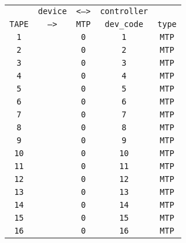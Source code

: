 \begin{adjustwidth}{5ex}{1ex}
	\begin{tabular}{ccccc}
		& \texttt{device} & \texttt{<-->} & \texttt{controller} &  \\
		\texttt{TAPE} & \texttt{-->} & \texttt{MTP}  & \texttt{dev\_code} & \texttt{type} \\
		\texttt{1} & & \texttt{0} &  \texttt{1} & \texttt{MTP} \\
		\texttt{2} & & \texttt{0} &  \texttt{2} & \texttt{MTP} \\
		\texttt{3} & & \texttt{0} &  \texttt{3} & \texttt{MTP} \\
		\texttt{4} & & \texttt{0} &  \texttt{4} & \texttt{MTP} \\
		\texttt{5} & & \texttt{0} &  \texttt{5} & \texttt{MTP} \\
		\texttt{6} & & \texttt{0} &  \texttt{6} & \texttt{MTP} \\
		\texttt{7} & & \texttt{0} &  \texttt{7} & \texttt{MTP} \\
		\texttt{8} & & \texttt{0} &  \texttt{8} & \texttt{MTP} \\
		\texttt{9} & & \texttt{0} &  \texttt{9} & \texttt{MTP} \\
		\texttt{10} & & \texttt{0} &  \texttt{10} & \texttt{MTP} \\
		\texttt{11} & & \texttt{0} &  \texttt{11} & \texttt{MTP} \\
		\texttt{12} & & \texttt{0} &  \texttt{12} & \texttt{MTP} \\
		\texttt{13} & & \texttt{0} &  \texttt{13} & \texttt{MTP} \\
		\texttt{14} & & \texttt{0} &  \texttt{14} & \texttt{MTP} \\
		\texttt{15} & & \texttt{0} &  \texttt{15} & \texttt{MTP} \\
		\texttt{16} & & \texttt{0} &  \texttt{16} & \texttt{MTP} \\
	\end{tabular}
\end{adjustwidth}
